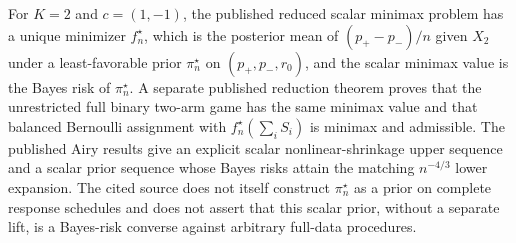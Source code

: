 For \(K=2\) and \(c=(1,-1)\), the published reduced scalar minimax problem has a unique minimizer \(f_n^\star\), which is the posterior mean of \((p_+-p_-)/n\) given \(X_2\) under a least-favorable prior \(\pi_n^\star\) on \((p_+,p_-,r_0)\), and the scalar minimax value is the Bayes risk of \(\pi_n^\star\). A separate published reduction theorem proves that the unrestricted full binary two-arm game has the same minimax value and that balanced Bernoulli assignment with \(f_n^\star(\sum_i S_i)\) is minimax and admissible. The published Airy results give an explicit scalar nonlinear-shrinkage upper sequence and a scalar prior sequence whose Bayes risks attain the matching \(n^{-4/3}\) lower expansion. The cited source does not itself construct \(\pi_n^\star\) as a prior on complete response schedules and does not assert that this scalar prior, without a separate lift, is a Bayes-risk converse against arbitrary full-data procedures.